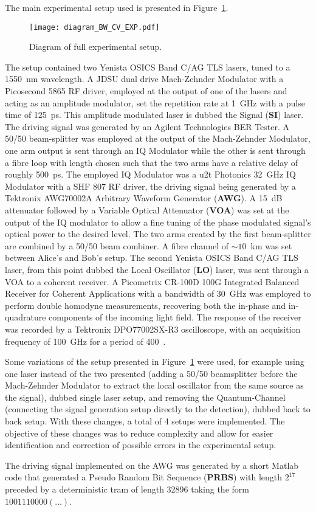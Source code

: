 The main experimental setup used is presented in Figure~\ref{fig:expDia}.
\begin{figure}[H]
\centering
\texttt{[image: diagram\_BW\_CV\_EXP.pdf]}
\caption{Diagram of full experimental setup.}
\label{fig:expDia}
\end{figure}
The setup contained two Yenista OSICS Band C/AG TLS lasers, tuned to a 1550~nm wavelength. A JDSU dual drive Mach-Zehnder Modulator with a Picosecond 5865 RF driver, employed at the output of one of the lasers and acting as an amplitude modulator, set the repetition rate at 1~GHz with a pulse time of 125~ps. This amplitude modulated laser is dubbed the Signal (\textbf{SI}) laser. The driving signal was generated by an Agilent Technologies BER Tester. A 50/50 beam-splitter was employed at the output of the Mach-Zehnder Modulator, one arm output is sent through an IQ Modulator while the other is sent through a fibre loop with length chosen such that the two arms have a relative delay of roughly 500~ps. The employed IQ Modulator was a u2t Photonics 32~GHz IQ Modulator with a SHF 807 RF driver, the driving signal being generated by a Tektronix AWG70002A Arbitrary Waveform Generator (\textbf{AWG}). A 15~dB attenuator followed by a Variable Optical Attenuator (\textbf{VOA}) was set at the output of the IQ modulator to allow a fine tuning of the phase modulated signal's optical power to the desired level. The two arms created by the first beam-splitter are combined by a 50/50 beam combiner. A fibre channel of $\sim10$~km was set between Alice's and Bob's setup. The second Yenista OSICS Band C/AG TLS laser, from this point dubbed the Local Oscillator (\textbf{LO}) laser, was sent through a VOA to a coherent receiver. A Picometrix CR-100D 100G Integrated Balanced Receiver for Coherent Applications with a bandwidth of  30~GHz was employed to perform double homodyne measurements, recovering both the in-phase and in-quadrature components of the incoming light field. The response of the receiver was recorded by a Tektronix DPO77002SX-R3 oscilloscope, with an acquisition frequency of 100~GHz for a period of 400~.
\par
Some variations of the setup presented in Figure~\ref{fig:expDia} were used, for example using one laser instead of the two presented (adding a 50/50 beamsplitter before the Mach-Zehnder Modulator to extract the local oscillator from the same source as the signal), dubbed single laser setup, and removing the Quantum-Channel (connecting the signal generation setup directly to the detection), dubbed back to back setup. With these changes, a total of 4 setups were implemented. The objective of these changes was to reduce complexity and allow for easier identification and correction of possible errors in the experimental setup.
\par
The driving signal implemented on the AWG was generated by a short Matlab code that generated a Pseudo Random Bit Sequence (\textbf{PRBS}) with length $2^{17}$ preceded by a deterministic tram of length 32896 taking the form $1001110000(...)$.

